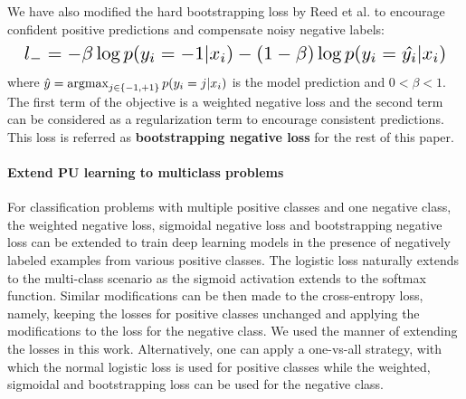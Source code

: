 We have also modified the hard bootstrapping loss by Reed et al. \cite{reed2014training} to encourage confident positive predictions and compensate noisy negative labels:
\begin{equation*}
  \resizebox{\columnwidth}{!}{
    $l_{-} = - \beta \log p(y_i=-1 \vert x_i) - (1-\beta) \log p(y_i=\hat{y_i} \vert x_i)$
    }
\end{equation*}
where $\hat{y} = \operatorname*{argmax}_{j\in\{-1,+1\}}{p(y_i=j \vert x_i)}$ is the model prediction and $0<\beta<1$.
The first term of the objective is a weighted negative loss and the second term can be considered as a regularization term to encourage consistent predictions.
This loss is referred as \textbf{bootstrapping negative loss} for the rest of this paper.

\paragraph{Extend PU learning to multiclass problems}

For classification problems with multiple positive classes and one negative class, the weighted negative loss, sigmoidal negative loss and bootstrapping negative loss can be extended to train deep learning models in the presence of negatively labeled examples from various positive classes.
The logistic loss naturally extends to the multi-class scenario as the sigmoid activation extends to the softmax function.
Similar modifications can be then made to the cross-entropy loss, namely, keeping the losses for positive classes unchanged and applying the modifications to the loss for the negative class.
We used the manner of extending the losses in this work.
Alternatively, one can apply a one-vs-all strategy, with which the normal logistic loss is used for positive classes while the weighted, sigmoidal and bootstrapping loss can be used for the negative class.

